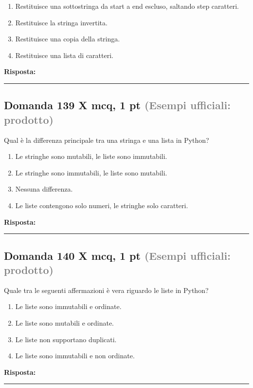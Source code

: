 \documentclass[a4paper,11pt]{article}
\begin{document}
\begin{enumerate}[label=\alph*)]
\item Restituisce una sottostringa da start a end escluso, saltando step caratteri.
\item Restituisce la stringa invertita.
\item Restituisce una copia della stringa.
\item Restituisce una lista di caratteri.
\end{enumerate}
\vspace{0.2cm}
\noindent\textbf{Risposta:}\par
\vspace{1.5cm}\hrule


\subsection*{Domanda 139 X \hfill {\small mcq, 1 pt \textcolor{gray}{(Esempi ufficiali: prodotto)}}}
Qual è la differenza principale tra una stringa e una lista in Python?

\begin{enumerate}[label=\alph*)]
\item Le stringhe sono mutabili, le liste sono immutabili.
\item Le stringhe sono immutabili, le liste sono mutabili.
\item Nessuna differenza.
\item Le liste contengono solo numeri, le stringhe solo caratteri.
\end{enumerate}
\vspace{0.2cm}
\noindent\textbf{Risposta:}\par
\vspace{1.5cm}\hrule


\subsection*{Domanda 140 X \hfill {\small mcq, 1 pt \textcolor{gray}{(Esempi ufficiali: prodotto)}}}
Quale tra le seguenti affermazioni è vera riguardo le liste in Python?

\begin{enumerate}[label=\alph*)]
\item Le liste sono immutabili e ordinate.
\item Le liste sono mutabili e ordinate.
\item Le liste non supportano duplicati.
\item Le liste sono immutabili e non ordinate.
\end{enumerate}
\vspace{0.2cm}
\noindent\textbf{Risposta:}\par
\vspace{1.5cm}\hrule
\end{document}
